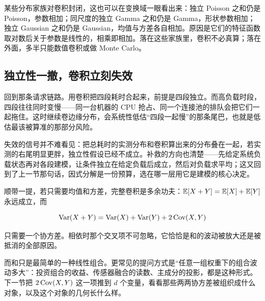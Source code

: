 某些分布家族对卷积封闭，这也可以在变换域一眼看出来：独立 Poisson 之和仍是 Poisson，参数相加；同尺度的独立 Gamma 之和仍是 Gamma，形状参数相加；独立 Gaussian 之和仍是 Gaussian，均值与方差各自相加。原因是它们的特征函数取对数后关于参数是线性的，相乘即相加。落在这些家族里，卷积不必真算；落在外面，多半只能数值卷积或做 Monte Carlo。

\subsection{独立性一撤，卷积立刻失效}

回到那条请求链路。用卷积把四段耗时合起来，前提是四段独立。而高负载时段，四段往往同时变慢——同一台机器的 CPU 抢占、同一个连接池的排队会把它们一起拖住。这时继续卷边缘分布，会系统性低估``四段一起慢''的那条尾巴，也就是低估最该被算准的那部分风险。

失效的信号并不难看见：把总耗时的实测分布和卷积算出来的分布叠在一起，若实测的右尾明显更胖，独立性假设已经不成立。补救的方向也清楚——先给定系统负载状态再对各段建模，让条件独立在给定负载后成立，然后对负载求平均；这又回到了上一节那句话，因式分解是一份预算，选在哪一层用它是建模的核心决定。

顺带一提，若只需要均值和方差，完整卷积是多余功夫：\(\mathbb{E}[X+Y]=\mathbb{E}[X]+\mathbb{E}[Y]\) 永远成立，而

\[
\operatorname{Var}(X+Y)=\operatorname{Var}(X)+\operatorname{Var}(Y)+2\operatorname{Cov}(X,Y)
\]

只需要一个协方差。相依时那个交叉项不可忽略，它恰恰是和的波动被放大还是被抵消的全部原因。

而和只是最简单的一种线性组合。更常见的提问方式是``任意一组权重下的组合波动多大''：投资组合的收益、传感器融合的读数、主成分的投影，都是这种形式。下一节把 \(2\operatorname{Cov}(X,Y)\) 这一项推到 \(d\) 个变量，看看那些两两协方差被组织成什么对象，以及这个对象的几何长什么样。
